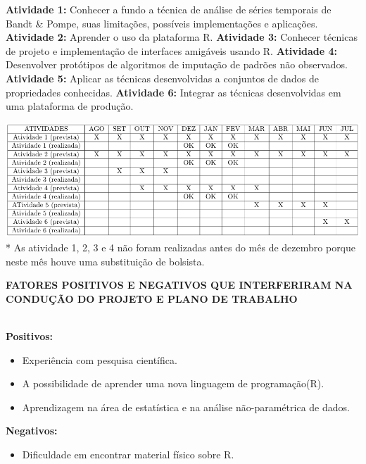\documentclass{article}
\begin{document}
\begin{flushleft}    
\textbf{Atividade 1:} Conhecer a fundo a técnica de análise de séries temporais de Bandt \& Pompe, suas limitações, possíveis implementações e aplicações.
\newline
\textbf{Atividade 2:} Aprender o uso da plataforma R.
\newline
\textbf{Atividade 3:} Conhecer técnicas de projeto e implementação de interfaces amigáveis usando R.
\newline
\textbf{Atividade 4:} Desenvolver protótipos de algoritmos de imputação de padrões não observados.
\newline
\textbf{Atividade 5:} Aplicar as técnicas desenvolvidas a conjuntos de dados de propriedades conhecidas.
\newline
\textbf{Atividade 6:} Integrar as técnicas desenvolvidas em uma plataforma de produção.
\end{flushleft}
\includegraphics[width=1.1\columnwidth]{tabela}
* As atividade 1, 2, 3 e 4 não foram realizadas antes do mês de dezembro porque neste mês houve uma substituição de bolsista.

\newpage
\begin{center}
\textbf{\large{FATORES POSITIVOS E NEGATIVOS QUE INTERFERIRAM NA CONDUÇÃO DO PROJETO E PLANO DE TRABALHO}}\\
\hrulefill \\
\end{center}
\textbf{Positivos:}
\begin{itemize}
    \item Experiência com pesquisa científica.
    \item A possibilidade de aprender uma nova linguagem de programação(R).
    \item Aprendizagem na área de estatística e na análise não-paramétrica de dados.
\end{itemize}
\textbf{Negativos:}
\begin{itemize}
    \item Dificuldade em encontrar material físico sobre R.
\end{itemize}

\newpage


\end{document}
